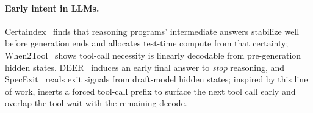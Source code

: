 \paragraph{Early intent in LLMs.}
Certaindex~\citep{fu_certaindex_2024} finds that reasoning programs' intermediate
answers stabilize well before generation ends and allocates test-time compute from
that certainty; When2Tool~\citep{sun_when2tool_2026} shows tool-call necessity is
linearly decodable from pre-generation hidden states.
DEER~\citep{yang_deer_2025} induces an early final answer to \emph{stop} reasoning, and
SpecExit~\citep{yang_specexit_2025} reads exit signals from draft-model hidden states;
inspired by this line of work, \spork{} inserts a forced tool-call prefix to surface
the next tool call early and overlap the tool wait with the remaining decode.
